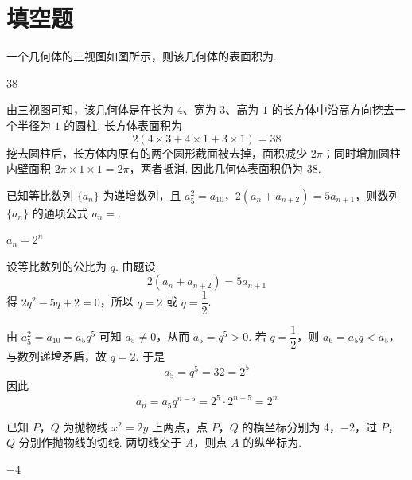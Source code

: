 \section{填空题}

\begin{problem}
一个几何体的三视图如图所示，则该几何体的表面积为\fillinblank{}.

\end{problem}

\begin{answer}
\(38\)
\end{answer}

\begin{solution}
由三视图可知，该几何体是在长为 \(4\)、宽为 \(3\)、高为 \(1\) 的长方体中沿高方向挖去一个半径为 \(1\) 的圆柱. 长方体表面积为
\[
2(4\times3+4\times1+3\times1)=38
\]
挖去圆柱后，长方体内原有的两个圆形截面被去掉，面积减少 \(2\pi\)；同时增加圆柱内壁面积 \(2\pi\times1\times1=2\pi\)，两者抵消. 因此几何体表面积仍为 \(38\).
\end{solution}

\begin{problem}
已知等比数列 \( \{a_{n}\} \) 为递增数列，且 \(a_{5}^{2}=a_{10}\)，\(2(a_{n}+a_{n+2})=5a_{n+1}\)，则数列 \( \{a_{n}\} \) 的通项公式 \( a_{n}= \)\fillinblank{}.
\end{problem}

\begin{answer}
\(a_{n}=2^{n}\)
\end{answer}

\begin{solution}
设等比数列的公比为 \(q\). 由题设
\[
2(a_n+a_{n+2})=5a_{n+1}
\]
得 \(2q^2-5q+2=0\)，所以 \(q=2\) 或 \(q=\dfrac12\).

由 \(a_5^2=a_{10}=a_5q^5\) 可知 \(a_5\neq0\)，从而 \(a_5=q^5>0\). 若 \(q=\dfrac12\)，则 \(a_6=a_5q<a_5\)，与数列递增矛盾，故 \(q=2\). 于是
\[
a_5=q^5=32=2^5
\]
因此
\[
a_n=a_5q^{n-5}=2^5\cdot2^{n-5}=2^n
\]
\end{solution}

\begin{problem}
已知 \(P\)，\(Q\) 为抛物线 \(x^{2} = 2y\) 上两点，点 \(P\)，\(Q\) 的横坐标分别为 4，\(-2\)，过 \(P\)，\(Q\) 分别作抛物线的切线. 两切线交于 \(A\)，则点 \(A\) 的纵坐标为\fillinblank{}.
\end{problem}

\begin{answer}
\(-4\)
\end{answer}

